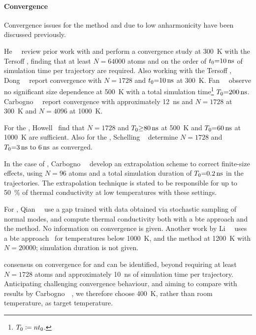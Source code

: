 \paragraph{Convergence}
Convergence issues for the \gk method \ffs and \aigk due to low anharmonicity have been discussed previously.

He~\etal~\cite{hsdg2012t} review prior work with \ffs and perform a convergence study at \qty{300}{K} with the Tersoff \ff, finding that at least $N{=}64000$ atoms and on the order of $t_0{=}\qty{10}{ns}$ of simulation time per trajectory are required. Also working with the Tersoff \ff, Dong~\etal~\cite{dfha2018t} report convergence with $N{=}1728$ and $t_0{=}\qty{10}{ns}$ at \qty{300}{K}. Fan~\etal~\cite{fpdh2015t} observe no significant size dependence at \qty{500}{K} with a total simulation time\footnote{$T_0\coloneqq nt_0$.} $T_0{=}\qty{200}{ns}$. Carbogno~\etal~\cite{crs2017t} report convergence with approximately \qty{12}{ns} and $N{=}1728$ at \qty{300}{K} and $N{=}4096$ at \qty{1000}{K}.

For the \sw \ff, Howell~\cite{h2012t} find that $N{=}1728$ and $T_0{\geq}\qty{80}{ns}$ at \qty{500}{K} and $T_0{=}\qty{60}{ns}$ at \qty{1000}{K} are sufficient. Also for the \sw \ff, Schelling \etal~\cite{spk2002t} determine $N{=}1728$ and $\Td{=}\qtyrange{3}{6}{ns}$ as converged.

In the case of \aigk, Carbogno~\etal~\cite{crs2017t} develop an extrapolation scheme to correct finite-size effects, using $N{=}96$ atoms and a total simulation duration of $T_0{=}\qty{0.2}{ns}$ in the \aimd trajectories. The extrapolation technique is stated to be responsible for up to \qty{50}{\percent} of thermal conductivity at low temperatures with these settings.

For \mlps, Qian~\etal~\cite{qpwy2019q} use a \gls{gap} trained with data obtained via stochastic sampling of normal modes, and compute thermal conductivity both with a \gls{bte} approach and the \gk method. No information on convergence is given. Another \mlp work by Li~\etal~\cite{lll2020q} uses a \gls{bte} approach~\cite{tgt2014t} for temperatures below \qty{1000}{K}, and the \gk method at \qty{1200}{K} with $N{=}20000$; simulation duration is not given.

 consensus on convergence for \ffs and \mlps can be identified, beyond requiring at least $N{=}1728$ atoms and approximately \qty{10}{ns} of simulation time per trajectory. Anticipating challenging convergence behaviour, and aiming to compare with results by Carbogno~\etal~\cite{crs2017t}, we therefore choose \qty{400}{K}, rather than room temperature, as target temperature.

